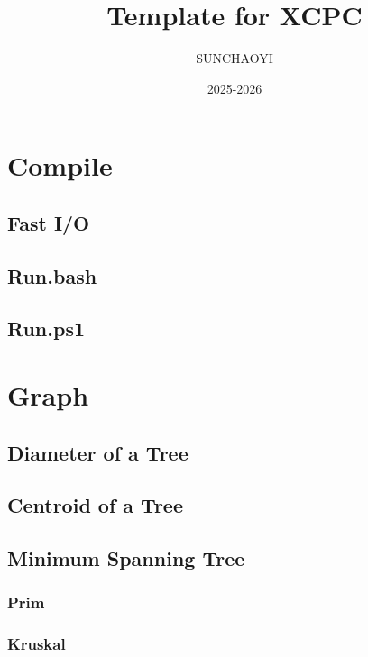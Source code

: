 \documentclass[a4paper]{article}
\title{Template for XCPC}
\author{SUNCHAOYI}
\date{2025-2026}
\begin{document}
\maketitle

\tableofcontents

\pagebreak

\section{Compile}

\subsection{Fast I/O}


\subsection{Run.bash}


\subsection{Run.ps1}


\pagebreak

\section{Graph}

\subsection{Diameter of a Tree}


\subsection{Centroid of a Tree}


\subsection{Minimum Spanning Tree}

\subsubsection{Prim}


\subsubsection{Kruskal}

\end{document}
